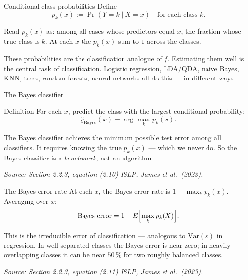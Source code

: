\documentclass[aspectratio=169,11pt]{beamer}
\newcommand{\islpsource}[1]{%
  \vfill\hfill{\tiny\itshape\color{gray}Source: #1 \textemdash{} ISLP, James et al.\ (2023).}\par
}
\begin{document}
\begin{frame}{Conditional class probabilities}
  Define
  \[
    \boxed{\;p_k(x) := \Pr(Y = k \mid X = x) \quad \text{for each class } k.\;}
  \]
  \begin{readme}
    Read $p_k(x)$ as: among all cases whose predictors equal $x$, the
    fraction whose true class is $k$. At each $x$ the $p_k(x)$ sum to
    $1$ across the classes.
  \end{readme}
  \begin{takeaway}
    These probabilities are the classification analogue of $f$.
    Estimating them well is the central task of classification.
    Logistic regression, LDA/QDA, naive Bayes, KNN, trees, random forests, neural networks
    all do this --- in different ways.
  \end{takeaway}
\end{frame}

\begin{frame}{The Bayes classifier}\label{frm:bayes}
  \begin{block}{Definition}
    For each $x$, predict the class with the largest conditional
    probability:
    \[
      \boxed{\;\hat y_{\text{Bayes}}(x) = \arg\max_k p_k(x).\;}
    \]
  \end{block}
  \begin{takeaway}
    The Bayes classifier achieves the minimum possible test error
    among all classifiers. It requires knowing the true $p_k(x)$ ---
    which we never do. So the Bayes classifier is a \emph{benchmark},
    not an algorithm.
  \end{takeaway}
  \islpsource{Section 2.2.3, equation (2.10)}
\end{frame}

\begin{frame}{The Bayes error rate}
  At each $x$, the Bayes error rate is $1 - \max_k p_k(x)$.
  Averaging over $x$:
  \[
    \mathrm{Bayes\ error} = 1 - E\Bigl[\max_k p_k(X)\Bigr].
  \]
  \begin{readme}
    This is the irreducible error of classification --- analogous to
    $\mathrm{Var}(\varepsilon)$ in regression. In well-separated
    classes the Bayes error is near zero; in heavily overlapping
    classes it can be near $50\,\%$ for two roughly balanced classes.
  \end{readme}
  \islpsource{Section 2.2.3, equation (2.11)}
\end{frame}
\end{document}

